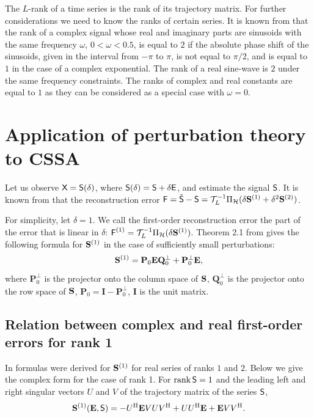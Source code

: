 \documentclass[engproc, submit, article,pdftex,moreauthors]{Definitions/mdpi}
\DeclareMathOperator\rank{rank}
\begin{document}
The $L$-rank of a time series is the rank of its trajectory matrix. For further considerations we need to know the ranks of certain series.
It is known from \cite{Golyandina.etal2013} that the rank of a complex signal whose real and imaginary parts are sinusoids with the same frequency $\omega$, $0<\omega<0.5$, is equal to $2$ if the absolute phase shift of the sinusoids, given in the interval from $-\pi$ to $\pi$, is not equal to $\pi/2$, and is equal to $1$ in the case of a complex exponential. The rank of a real sine-wave is $2$ under the same frequency constraints. The ranks of complex and real constants are equal to $1$ as they can be considered as a special case with $\omega = 0$.

\section{Application of perturbation theory to CSSA}

Let us observe $\textsf{X} = \textsf{S}(\delta)$, where $\textsf{S}(\delta) = \textsf{S} + \delta \textsf{E}$, and estimate the signal $\textsf{S}$.
It is known from \cite{Nekrutkin} that
the reconstruction error $\textsf{F} = \tilde{\textsf{S}} - \textsf{S} = \mathcal{T}_L^{-1} \Pi_{\mathcal{H}} (\delta\mathbf{S}^{(1)} + \delta^2\mathbf{S}^{(2)})$.

For simplicity, let $\delta = 1$. We call the first-order reconstruction error the part of the error that is linear in $\delta$: $\textsf{F}^{(1)} = \mathcal{T}_L^{-1} \Pi_{\mathcal{H}} (\delta\mathbf{S}^{(1)})$.
Theorem 2.1 from \cite{Nekrutkin} gives the following formula for $\mathbf{S}^{(1)}$ in the case of sufficiently small perturbations:
\begin{equation} \label{eq:main}
	\mathbf{S}^{(1)} = \mathbf{P}_0 \mathbf{E} \mathbf{Q}^{\perp}_0 + \mathbf{P}^{\perp}_0 \mathbf{E},
\end{equation}
where $\mathbf{P}^{\perp}_0$ is the projector onto the column space of $\mathbf{S}$, $\mathbf{Q}^{\perp}_0$ is the projector onto the row space of $\mathbf{S}$, $\mathbf{P}_0 = \mathbf{I} - \mathbf{P}^{\perp}_0$, $\mathbf{I}$ is the unit matrix.

\subsection{Relation between complex and real first-order errors for rank 1}

In \cite{Nekrutkin} formulas were derived for $\mathbf{S}^{(1)}$ for real series of ranks $1$ and $2$. Below we give the complex form for the case of rank 1.
For $\rank \tS = 1$ and the leading left and right singular vectors $U$ and $V$ of the trajectory matrix of the series $\textsf{S}$,
\begin{equation} \label{eq:main1}
	\mathbf{S}^{(1)}(\mathbf{E}, \textsf{S}) = -U^{\mathrm{H}} \mathbf{E} V U V^{\mathrm{H}} + U U^{\mathrm{H}} \mathbf{E} + \mathbf{E} V V^{\mathrm{H}}.
\end{equation}
\end{document}
